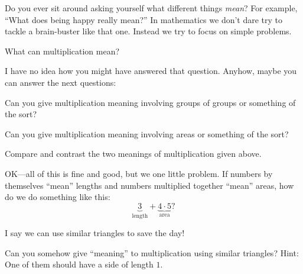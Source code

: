 Do you ever sit around asking yourself what different things
\textit{mean}? For example, ``What does being happy really mean?'' In
mathematics we don't dare try to tackle a brain-buster like that
one. Instead we try to focus on simple problems.

\begin{question} What can multiplication mean? 
\end{question}
\QM

I have no idea how you might have answered that question. Anyhow,
maybe you can answer the next questions:

\begin{question} 
Can you give multiplication meaning involving groups of groups or
something of the sort?
\end{question}
\QM

\begin{question} 
Can you give multiplication meaning involving areas or something of
the sort?
\end{question}
\QM

\begin{question}
Compare and contrast the two meanings of multiplication given above.
\end{question}

OK---all of this is fine and good, but we one little problem. If
numbers by themselves ``mean'' lengths and numbers multiplied together
``mean'' areas, how do we do something like this:
\[
\underbrace{3}_\text{length} + \underbrace{4\cdot 5}_\text{area}?
\]


I say we can use similar triangles to save the day!


\begin{question} 
Can you somehow give ``meaning'' to multiplication using similar
triangles? Hint: One of them should have a side of length $1$.
\end{question}
\QM


